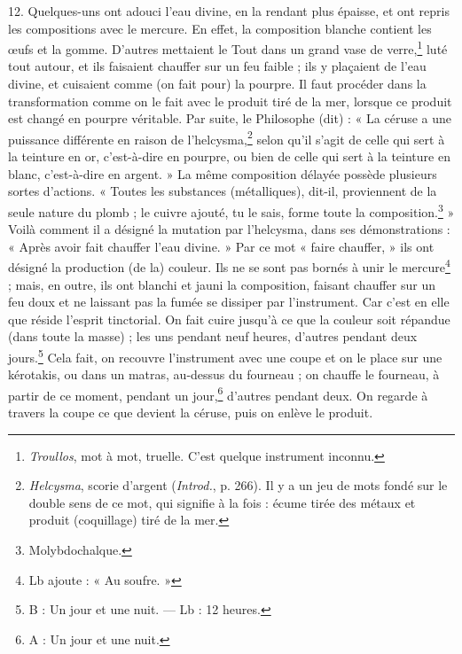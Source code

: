 \documentclass[a4paper, 11pt, oneside, polutonikogreek, french]{article}
\begin{document}
12. Quelques-uns ont adouci l'eau divine, en la rendant plus épaisse, et ont repris les compositions avec le mercure. En effet, la composition blanche contient les œufs et la gomme. D'autres mettaient le Tout dans un grand vase de verre,\footnote{\emph{Troullos}, mot à mot, truelle. C'est quelque instrument inconnu.} luté tout autour, et ils faisaient chauffer sur un feu faible ; ils y plaçaient de l'eau divine, et cuisaient comme (on fait pour) la pourpre. Il faut procéder dans la transformation comme on le fait avec le produit tiré de la mer, lorsque ce produit est changé en pourpre véritable. Par suite, le Philosophe (dit) : « La céruse a une puissance différente en raison de l'helcysma,\footnote{\emph{Helcysma}, scorie d'argent (\emph{Introd.}, p. 266). Il y a un jeu de mots fondé sur le double sens de ce mot, qui signifie à la fois : écume tirée des métaux et produit (coquillage) tiré de la mer.} selon qu'il s'agit de celle qui sert à la teinture en or, c'est-à-dire en pourpre, ou bien de celle qui sert à la teinture en blanc, c'est-à-dire en argent. » La même composition délayée possède plusieurs sortes d'actions. « Toutes les substances (métalliques), dit-il, proviennent de la seule nature du plomb ; le cuivre ajouté, tu le sais, forme toute la composition.\footnote{Molybdochalque.} » Voilà comment il a désigné la mutation par l'helcysma, dans ses démonstrations : « Après avoir fait chauffer l'eau divine. » Par ce mot « faire chauffer, » ils ont désigné la production (de la) couleur. Ils ne se sont pas bornés à unir le mercure\footnote{Lb ajoute : « Au soufre. »} ; mais, en outre, ils ont blanchi et jauni la composition, faisant chauffer sur un feu doux et ne laissant pas la fumée se dissiper par l'instrument. Car c'est en elle que réside l'esprit tinctorial. On fait cuire jusqu'à ce que la couleur soit répandue (dans toute la masse) ; les uns pendant neuf heures, d'autres pendant deux jours.\footnote{B : Un jour et une nuit. --- Lb : 12 heures.} Cela fait, on recouvre l'instrument avec une coupe et on le place sur une kérotakis, ou dans un matras, au-dessus du fourneau ; on chauffe le fourneau, à partir de ce moment, pendant un jour,\footnote{A : Un jour et une nuit.} d'autres pendant deux. On regarde à travers la coupe ce que devient la céruse, puis on enlève le produit.
\end{document}
